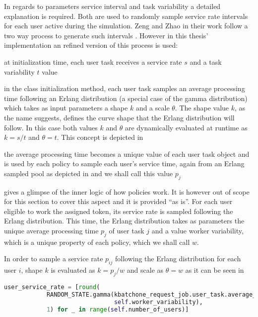 \documentclass{seal_thesis}
\begin{document}
In regards to parameters service interval and task variability a detailed explanation is required. Both are used to randomly sample service rate intervals for each user active during the simulation. Zeng and Zhao in their work follow a two way process to generate such intervals \cite[p. 8]{Zeng2005}. However in this thesis' implementation an refined version of this process is used:
\begin{enumerate*}
	\item at initialization time, each user task receives a service rate $s$ and a task variability $t$ value
	\item in the class initialization method, each user task samples an average processing time following an Erlang distribution (a special case of the gamma distribution) which takes as input parameters a shape $k$ and a scale $\theta$. The shape value $k$, as the name suggests, defines the curve shape that the Erlang distribution will follow. In this case both values $k$ and $\theta$ are dynamically evaluated at runtime as $k=s/t$ and $\theta = t$. This concept is depicted in 
	\item the average processing time becomes a unique value of each user task object and is used by each policy to sample each user's service time, again from an Erlang sampled pool as depicted in  and we shall call this value $p_j$
\end{enumerate*}

 gives a glimpse of the inner logic of how policies work. It is however out of scope for this section to cover this aspect and it is provided ``as is''. For each user eligible to work the assigned token, its service rate is sampled following the Erlang distribution. This time, the Erlang distribution takes as parameters the unique average processing time $p_j$ of user task $j$ and a value worker variability, which is a unique property of each policy, which we shall call $w$.

In order to sample a service rate $p_{ij}$ following the Erlang distribution for each user $i$, shape $k$ is evaluated as $k=p_j/w$ and scale as $\theta = w$ as it can be seen in 



\begin{lstlisting}[caption=User service rate sampling following an Erlang distribution,label=lst:user_service_rate,language=Python]
    user_service_rate = [round(
            RANDOM_STATE.gamma(kbatchone_request_job.user_task.average_processing_time / self.worker_variability,
                               self.worker_variability),
            1) for _ in range(self.number_of_users)]
\end{lstlisting}
\end{document}

